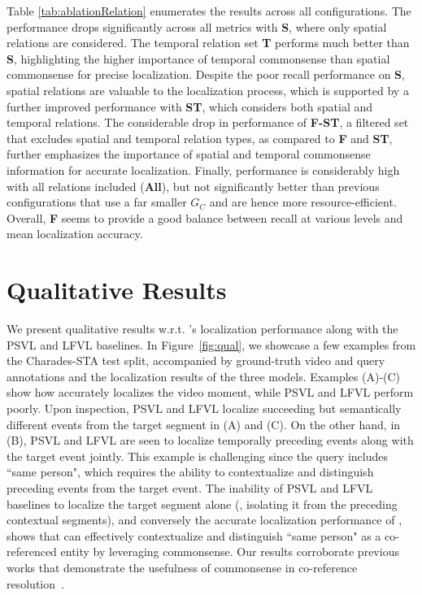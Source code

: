 Table \ref{tab:ablationRelation} enumerates the results across all \modelname configurations. 
The performance drops significantly across all metrics with \textbf{S}, where only spatial relations are considered. The temporal relation set \textbf{T} performs much better than \textbf{S}, highlighting the higher importance of temporal commonsense than spatial commonsense for precise localization. Despite the poor recall performance on \textbf{S}, spatial relations are valuable to the localization process, which is supported by a further improved performance with \textbf{ST}, which considers both spatial and temporal relations. The considerable drop in performance of \textbf{F-ST}, a filtered set that excludes spatial and temporal relation types, as compared to \textbf{F} and \textbf{ST}, further emphasizes the importance of spatial and temporal commonsense information for accurate localization. 
Finally, performance is considerably high with all relations included (\textbf{All}), but not significantly better than previous configurations that use a far smaller $G_{C}$ and are hence more resource-efficient. Overall, \textbf{F} seems to provide a good balance between recall at various levels and mean localization accuracy. 

\section{Qualitative Results}
We present qualitative results w.r.t. \modelname's localization performance along with the PSVL and LFVL baselines. In Figure~\ref{fig:qual}, we showcase a few examples from the Charades-STA test split, accompanied by ground-truth video and query annotations and the localization results of the three models. Examples (A)-(C) show how \modelname accurately localizes the video moment, while PSVL and LFVL perform poorly. Upon inspection, PSVL and LFVL localize succeeding but semantically different events from the target segment in (A) and (C). 
On the other hand, in (B), PSVL and LFVL are seen to localize temporally preceding events along with the target event jointly. 
This example is challenging since the query includes ``same person", which requires the ability to contextualize and distinguish preceding events from the target event. The inability of PSVL and LFVL baselines to localize the target segment alone (\ie, isolating it from the preceding contextual segments), and conversely the accurate localization performance of \modelname, shows that \modelname can effectively contextualize and distinguish ``same person" as a co-referenced entity by leveraging commonsense. Our results corroborate previous works that demonstrate the usefulness of commonsense in co-reference resolution~\cite{coref_commonsense_ieee, coref_commonsense_acl_ravi-etal-2023-happens}. 

